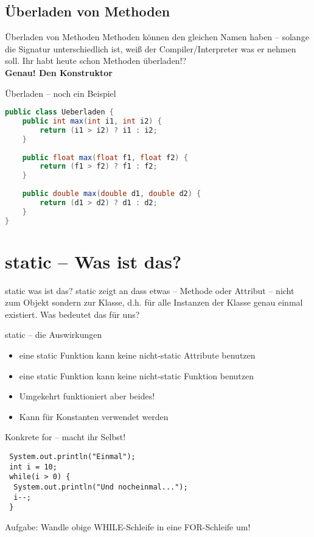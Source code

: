 \documentclass[18pt]{beamer}
\begin{document}
\subsection{Überladen von Methoden}
\begin{frame}{Überladen von Methoden}
 Methoden können den gleichen Namen haben – solange die Signatur unterschiedlich ist, weiß der Compiler/Interpreter was er nehmen soll.
 Ihr habt heute schon Methoden überladen!? \\ \pause
 \textbf{Genau! Den Konstruktor}
\end{frame}

\begin{frame}[fragile]{Überladen – noch ein Beispiel}
 \begin{lstlisting}[language=java]
public class Ueberladen {
    public int max(int i1, int i2) { 
        return (i1 > i2) ? i1 : i2; 
    }
   
    public float max(float f1, float f2) { 
        return (f1 > f2) ? f1 : f2; 
    }
    
    public double max(double d1, double d2) { 
        return (d1 > d2) ? d1 : d2; 
    }
} 
 \end{lstlisting}
\end{frame}

\section{static – Was ist das?}
\begin{frame}{static was ist das?}
 static zeigt an dass etwas – Methode oder Attribut – nicht zum Objekt sondern zur Klasse, d.h. für alle Instanzen der Klasse genau einmal existiert.
 Was bedeutet das für uns?
\end{frame}

\begin{frame}{static – die Auswirkungen}
\begin{itemize}
 \item eine static Funktion kann keine nicht-static Attribute benutzen
 \item eine static Funktion kann keine nicht-static Funktion benutzen
 \item Umgekehrt funktioniert aber beides!
 \item Kann für Konstanten verwendet werden
\end{itemize}
 

\end{frame}


\begin{frame}[fragile]{Konkrete for – macht ihr Selbst!}
 \begin{lstlisting}
 System.out.println("Einmal");
 int i = 10;
 while(i > 0) {
  System.out.println("Und nocheinmal...");
  i--;
 }
 \end{lstlisting}
 Aufgabe: Wandle obige WHILE-Schleife in eine FOR-Schleife um!
\end{frame}
\end{document}

